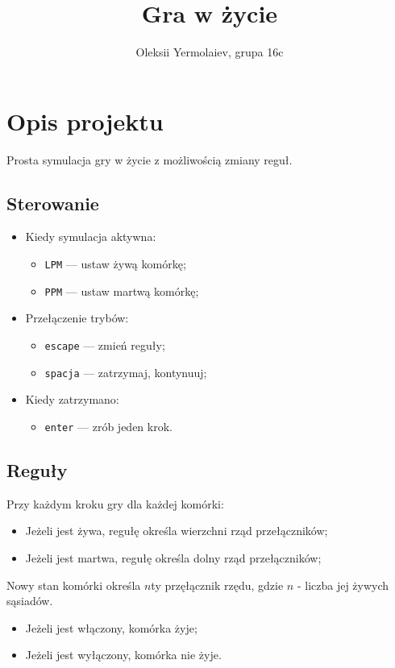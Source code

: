 \documentclass{article}
\title{Gra w życie}
\author{Oleksii Yermolaiev, grupa 16c}
\begin{document}
\maketitle

\section{Opis projektu}
Prosta symulacja gry w życie z możliwością zmiany reguł.

\subsection{Sterowanie}
\begin{itemize}
  \item Kiedy symulacja aktywna:
    \begin{itemize}
      \item \texttt{LPM} --- ustaw żywą komórkę;
      \item \texttt{PPM} --- ustaw martwą komórkę;
    \end{itemize}
  \item Przełączenie trybów:
    \begin{itemize}
      \item \texttt{escape} --- zmień reguły;
      \item \texttt{spacja} --- zatrzymaj, kontynuuj;
    \end{itemize}
  \item Kiedy zatrzymano:
    \begin{itemize}
      \item \texttt{enter}  --- zrób jeden krok.
    \end{itemize}
\end{itemize}

\subsection{Reguły}
Przy każdym kroku gry dla każdej komórki:
\begin{itemize}
  \item Jeżeli jest żywa, regułę określa wierzchni rząd przełączników;
  \item Jeżeli jest martwa, regułę określa dolny rząd przełączników;
\end{itemize}
Nowy stan komórki określa $n$ty przęłącznik rzędu, gdzie $n$ - liczba jej żywych sąsiadów.
\begin{itemize}
  \item Jeżeli jest włączony, komórka żyje;
  \item Jeżeli jest wyłączony, komórka nie żyje.
\end{itemize}
\end{document}
